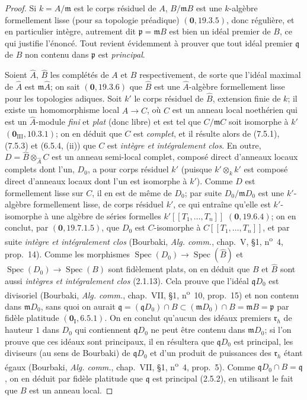 \begin{proof}
Si $k=A/\mathfrak m$ est le corps résiduel de $A$, $B/\mathfrak mB$ est une
$k$-algèbre formellement lisse (pour
sa topologie préadique) $(\mathbf 0, 19.3.5)$,
donc régulière, et en particulier intègre, autrement dit
$\mathfrak p=\mathfrak mB$ est bien un idéal premier de $B$, ce qui justifie
l'énoncé. Tout revient évidemment à prouver que tout idéal premier $\mathfrak q$ de
$B$ non contenu dans $\mathfrak p$ est \emph{principal}.

Soient $\widehat A$, $\widehat B$ les complétés de $A$ et $B$ respectivement, de
sorte que l'idéal maximal de $\widehat A$ est $\mathfrak m\widehat A$; on sait
$(\mathbf 0, 19.3.6)$ que $\widehat B$ est une $\widehat A$-algèbre formellement
lisse pour les topologies adiques. Soit $k'$ le corps résiduel de $\widehat B$,
extension finie de $k$; il existe un homomorphisme local $\widehat A\to C$, où $C$
est un anneau local noethérien qui est un $\widehat A$-module \emph{fini} et
\emph{plat} (donc libre) et est tel que $C/\mathfrak mC$ soit isomorphe à $k'$
$(\mathbf 0_{\mathrm{III}}, 10.3.1)$; on en déduit que $C$ est \emph{complet}, et il
résulte alors de (7.5.1), (7.5.3) et (6.5.4, (ii)) que $C$ est \emph{intègre et
intégralement clos}. En outre, $D=\widehat B\otimes_{\widehat A}C$
est un anneau semi-local complet, composé direct d'anneaux locaux complets dont l'un,
$D_0$, a pour corps résiduel $k'$ (puisque $k'\otimes_k k'$ est composé direct
d'anneaux locaux dont l'un est isomorphe à $k'$). Comme $D$ est formellement lisse
sur $C$, il en est de même de $D_0$; par suite $D_0/\mathfrak mD_0$ est une
$k'$-algèbre formellement lisse, de corps résiduel $k'$, ce qui entraîne qu'elle est
$k'$-isomorphe à une algèbre de séries formelles
$k'[[T_1,\ldots,T_n]]$ $(\mathbf 0, 19.6.4)$; on en conclut, par
$(\mathbf 0, 19.7.1.5)$, que $D_0$ est $C$-isomorphe à
$C[[T_1,\ldots,T_n]]$, et par suite \emph{intègre et intégralement clos} (Bourbaki,
\emph{Alg. comm.}, chap.~V, \S1, n\textsuperscript{o}~4, prop.~14). Comme les
morphismes $\operatorname{Spec}(D_0)\to\operatorname{Spec}(\widehat B)$ et
$\operatorname{Spec}(D_0)\to\operatorname{Spec}(B)$ sont fidèlement plats, on en
déduit que $B$ et $\widehat B$ sont aussi \emph{intègres et intégralement clos}
(2.1.13). Cela prouve que l'idéal $\mathfrak qD_0$ est divisoriel (Bourbaki,
\emph{Alg. comm.}, chap.~VII, \S1, n\textsuperscript{o}~10, prop.~15) et non contenu
dans $\mathfrak mD_0$, sans quoi on aurait
$\mathfrak q=(\mathfrak qD_0)\cap B\subset(\mathfrak mD_0)\cap B=\mathfrak mB=\mathfrak p$
par fidèle platitude $(\mathbf 0_{\mathrm I}, 6.5.1)$. On en conclut qu'aucun des
idéaux premiers $\mathfrak r_h$ de hauteur $1$ dans $D_0$ qui contiennent
$\mathfrak qD_0$ ne peut être contenu dans $\mathfrak mD_0$; si l'on prouve que ces
idéaux sont principaux, il en résultera que $\mathfrak qD_0$ est principal, les
diviseurs (au sens de Bourbaki) de $\mathfrak qD_0$ et d'un produit de puissances des
$\mathfrak r_h$ étant égaux (Bourbaki, \emph{Alg. comm.}, chap.~VII, \S1,
n\textsuperscript{o}~4, prop.~5). Comme $\mathfrak qD_0\cap B=\mathfrak q$, on en
déduit par fidèle platitude que $\mathfrak q$ est principal (2.5.2), en utilisant le
fait que $B$ est un anneau local.


\end{proof}
